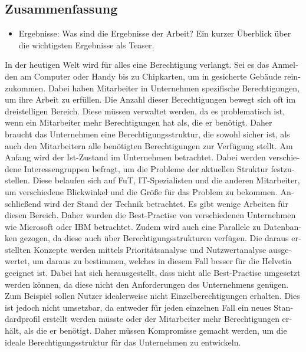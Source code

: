 \begin{otherlanguage}{ngerman}
	\chapter*{Zusammenfassung}
	\begin{itemize}
          \item Ergebnisse: Was sind die Ergebnisse der Arbeit? Ein kurzer Überblick über die wichtigsten Ergebnisse als Teaser.
	\end{itemize}
In der heutigen Welt wird für alles eine Berechtigung verlangt.
Sei es das Anmelden am Computer oder Handy bis zu Chipkarten, um in gesicherte Gebäude reinzukommen.
Dabei haben Mitarbeiter in Unternehmen spezifische Berechtigungen, um ihre Arbeit zu erfüllen.
Die Anzahl dieser Berechtigungen bewegt sich oft im dreistelligen Bereich.
Diese müssen verwaltet werden, da es problematisch ist, wenn ein Mitarbeiter mehr Berechtigungen hat als, die er benötigt.
Daher braucht das Unternehmen eine Berechtigungsstruktur, die sowohl sicher ist, als auch den Mitarbeitern alle benötigten Berechtigungen zur Verfügung stellt.
\newline
Am Anfang wird der Ist-Zustand im Unternehmen betrachtet.
Dabei werden verschiedene Interessengruppen befragt, um die Probleme der aktuellen Struktur festzustellen.
Diese belaufen sich auf \ac{FuT}, IT-Spezialisten und die anderen Mitarbeiter, um verschiedene Blickwinkel und die Größe für das Problem zu bekommen.
Anschließend wird der Stand der Technik betrachtet.
Es gibt wenige Arbeiten für diesen Bereich.
Daher wurden die Best-Practise von verschiedenen Unternehmen wie Microsoft oder IBM betrachtet.
Zudem wird auch eine Parallele zu Datenbanken gezogen, da diese auch über Berechtigungsstrukturen verfügen.
Die daraus erstellten Konzepte werden mittels Prioritätsanalyse und Nutzwertanalyse ausgewertet, um daraus zu bestimmen, welches in diesem Fall besser für die Helvetia geeignet ist.
\newline
Dabei hat sich herausgestellt, dass nicht alle Best-Practise umgesetzt werden können, da diese nicht den Anforderungen des Unternehmens genügen.
Zum Beispiel sollen Nutzer idealerweise nicht Einzelberechtigungen erhalten.
Dies ist jedoch nicht umsetzbar, da entweder für jeden einzelnen Fall ein neues Standardprofil erstellt werden müsste oder der Mitarbeiter mehr Berechtigungen erhält, als die er benötigt.
Daher müssen Kompromisse gemacht werden, um die ideale Berechtigungsstruktur für das Unternehmen zu entwickeln.
\end{otherlanguage}
